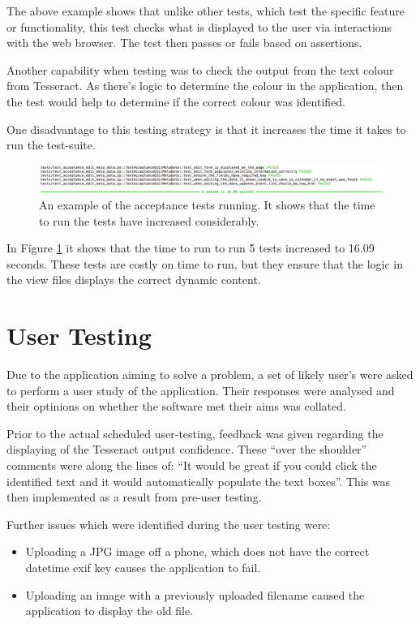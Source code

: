 The above example shows that unlike other tests, which test the specific feature or functionality, this test checks what is displayed to the user via interactions with the web browser. The test then passes or fails based on assertions.

Another capability when testing was to check the output from the text colour from Tesseract. As there's logic to determine the colour in the application, then the test would help to determine if the correct colour was identified.

One disadvantage to this testing strategy is that it increases the time it takes to run the test-suite.

\begin{figure}[h]
  \centering
  \includegraphics{images/acceptance_test_1}
  \caption{An example of the acceptance tests running. It shows that the time to run the tests have increased considerably.}
  \label{fig:acceptance_test_1}
\end{figure}

In Figure \ref{fig:acceptance_test_1} it shows that the time to run to run 5 tests increased to 16.09 seconds. These tests are costly on time to run, but they ensure that the logic in the view files displays the correct dynamic content.

\section{User Testing}
Due to the application aiming to solve a problem, a set of likely user's were asked to perform a user study of the application. Their responses were analysed and their optinions on whether the software met their aims was collated.

Prior to the actual scheduled user-testing, feedback was given regarding the displaying of the Tesseract output confidence. These ``over the shoulder'' comments were along the lines of: ``It would be great if you could click the identified text and it would automatically populate the text boxes''. This was then implemented as a result from pre-user testing.

Further issues which were identified during the user testing were:
\begin{itemize}
  \item Uploading a JPG image off a phone, which does not have the correct datetime exif key causes the application to fail.
  \item Uploading an image with a previously uploaded filename caused the application to display the old file.
\end{itemize}

